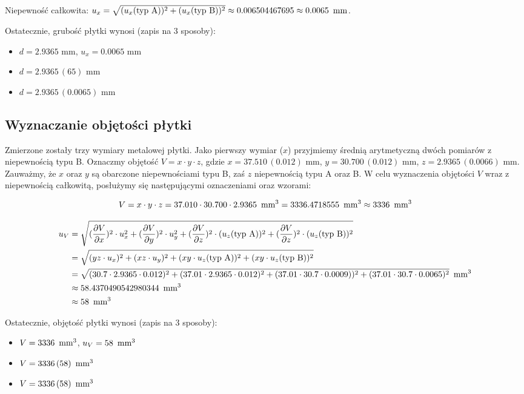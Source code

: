 \documentclass[a4paper]{article}
\begin{document}
Niepewność całkowita: $u_x = \sqrt{(u_x (\text{typ A}))^2 + (u_x (\text{typ B}))^2} \approx 0.006504467695 \approx 0.0065 \enskip \text{mm}$.

Ostatecznie, grubość płytki wynosi (zapis na 3 sposoby):
\begin{itemize}
\item $d = 2.9365$ mm, $u_x = 0.0065$ mm
\item $d = 2.9365 \, (65)$ mm
\item $d = 2.9365 \, (0.0065)$ mm
\end{itemize}

\subsection{Wyznaczanie objętości płytki}

Zmierzone zostały trzy wymiary metalowej płytki.
Jako pierwszy wymiar ($x$) przyjmiemy średnią arytmetyczną dwóch pomiarów z niepewnością typu B.
Oznaczmy objętość $V = x \cdot y \cdot z$, gdzie $x = 37.510 \, (0.012)$ mm, $y = 30.700 \, (0.012)$ mm, $z = 2.9365 \, (0.0066)$ mm.
Zauważmy, że $x$ oraz $y$ są obarczone niepewnościami typu B, zaś $z$ niepewnością typu A oraz B.
W celu wyznaczenia objętości $V$ wraz z niepewnością całkowitą, posłużymy się następującymi oznaczeniami oraz wzorami:

$$V = x \cdot y \cdot z = 37.010 \cdot 30.700 \cdot 2.9365 \enskip \text{mm}^3 = 3336.4718555 \enskip \text{mm}^3 \approx 3336 \enskip \text{mm}^3$$

\begin{align*}
u_V &= \sqrt{(\frac{\partial V}{\partial x})^2 \cdot u_x^2 + (\frac{\partial V}{\partial y})^2 \cdot u_y^2 + (\frac{\partial V}{\partial z})^2 \cdot (u_z \text{(typ A)})^2 + (\frac{\partial V}{\partial z})^2 \cdot (u_z \text{(typ B)})^2} \\
	&= \sqrt{(yz \cdot u_x)^2 + (xz \cdot u_y)^2 + (xy \cdot u_z \text{(typ A)})^2 + (xy \cdot u_z \text{(typ B)})^2} \\
	&= \sqrt{(30.7 \cdot 2.9365 \cdot 0.012)^2 + (37.01 \cdot 2.9365 \cdot 0.012)^2 + (37.01 \cdot 30.7 \cdot 0.0009))^2 + (37.01 \cdot 30.7 \cdot 0.0065)^2} \enskip \text{mm}^3\\
	&\approx 58.4370490542980344 \enskip \text{mm}^3 \\
	&\approx 58 \enskip \text{mm}^3
\end{align*}

Ostatecznie, objętość płytki wynosi (zapis na 3 sposoby):

\begin{itemize}
\item $V = 3336 \enskip \text{mm}^3$, $u_V = 58 \enskip \text{mm}^3$
\item $V = 3336 \, (58) \enskip \text{mm}^3$
\item $V = 3336 \, (58) \enskip \text{mm}^3$
\end{itemize}
\end{document}
